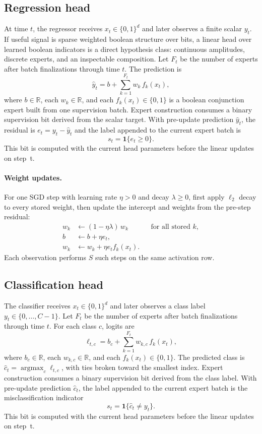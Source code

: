 \documentclass[11pt]{article}
\begin{document}
\subsection{Regression head}
At time $t$, the regressor receives $x_t\in\{0,1\}^d$ and later observes a
finite scalar $y_t$.  If useful signal is sparse weighted boolean structure
over bits, a linear head over learned boolean indicators is a direct hypothesis
class: continuous amplitudes, discrete experts, and an inspectable
composition.
Let $F_t$ be the number of experts after batch finalizations through
time $t$.  The prediction is
\[
\hat y_t
=
b
+
\sum_{k=1}^{F_t}
w_k\,f_k(x_t),
\]
where $b\in\mathbb R$, each $w_k\in\mathbb R$, and each
$f_k(x_t)\in\{0,1\}$ is a boolean conjunction expert built from one supervision batch.
Expert construction consumes a binary supervision bit derived from the scalar
target.  With pre-update prediction $\hat y_t$, the residual is
$e_t=y_t-\hat y_t$ and the label appended to the current expert batch is
\[
s_t=\mathbf{1}\{e_t\geq 0\}.
\]
This bit is computed with the current head parameters before the linear
updates on step~t.

\paragraph{Weight updates.}
For one SGD step with learning rate $\eta>0$ and decay $\lambda\geq 0$, first
apply $\ell_2$ decay to every stored weight, then update the intercept and
weights from the pre-step residual:
\begin{align*}
w_k &\leftarrow (1-\eta\lambda)\,w_k
&&\text{for all stored }k,\\
b &\leftarrow b+\eta e_t,\\
w_k &\leftarrow w_k+\eta e_t f_k(x_t).
\end{align*}
Each observation performs $S$ such steps on the same activation row.

\subsection{Classification head}
The classifier receives $x_t\in\{0,1\}^d$ and later observes a class label
$y_t\in\{0,\ldots,C-1\}$.  Let $F_t$ be the number of experts after
batch finalizations through time $t$.  For each class $c$, logits are
\[
\ell_{t,c}
=
b_c
+
\sum_{k=1}^{F_t}
w_{k,c}\,f_k(x_t),
\]
where $b_c\in\mathbb R$, each $w_{k,c}\in\mathbb R$, and each
$f_k(x_t)\in\{0,1\}$.  The predicted class
is $\hat c_t=\operatorname*{argmax}_c \ell_{t,c}$, with ties broken toward the
smallest index.
Expert construction consumes a binary supervision bit derived from the class label.
With pre-update prediction $\hat c_t$, the label appended to the current
expert batch is the misclassification indicator
\[
s_t=\mathbf{1}\{\hat c_t\neq y_t\}.
\]
This bit is computed with the current head parameters before the linear
updates on step~t.
\end{document}

